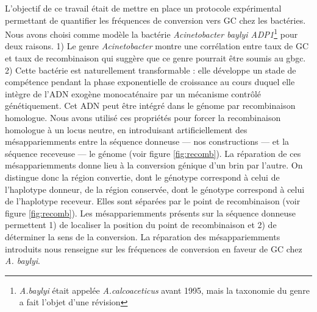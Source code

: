 L'objectif de ce travail était de mettre en place un protocole expérimental
permettant de quantifier les fréquences de conversion vers GC chez les
bactéries. Nous avons choisi comme modèle la bactérie \emph{Acinetobacter baylyi
  ADP1}\footnote{\emph{A.baylyi} était appelée \emph{A.calcoaceticus} avant
  1995, mais la taxonomie du genre a fait l'objet d'une
  révision\cite{euzeby_list_1997}} pour deux raisons. 1) Le genre
\emph{Acinetobacter} montre une corrélation entre taux de GC et taux de
recombinaison\cite{lassalle_gc-content_2015} qui suggère que ce genre pourrait
être soumis au \ac{gbgc}. 2) Cette bactérie est naturellement transformable :
elle développe un stade de compétence pendant la phase exponentielle de
croissance au cours duquel elle intègre de l'ADN exogène
monocaténaire par un mécanisme contrôlé génétiquement\cite{chen_dna_2004}. Cet
ADN peut être intégré dans le génome par recombinaison homologue. Nous avons
utilisé ces propriétés pour forcer la recombinaison homologue à un locus neutre,
en introduisant artificiellement des mésappariemments entre la séquence donneuse
--- nos constructions --- et la séquence receveuse --- le génome (voir figure
\ref{fig:recomb}). La réparation de ces mésappariemments donne lieu à la
conversion génique d'un brin par l'autre. On distingue donc la région convertie,
dont le génotype correspond à celui de l'haplotype donneur, de la région
conservée, dont le génotype correspond à celui de l'haplotype receveur. Elles
sont séparées par le point de recombinaison (voir figure \ref{fig:recomb}).
Les mésappariemments présents sur la séquence donneuse permettent 1) de
localiser la position du point de recombinaison et 2) de déterminer la sens de
la conversion. La réparation des mésappariemments introduits nous renseigne sur
les fréquences de conversion en faveur de GC chez \emph{A. baylyi}.


\newpage
%